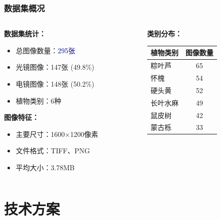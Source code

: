 \documentclass[12pt]{beamer}
\begin{document}
\begin{frame}
\frametitle{数据集概况}
\begin{columns}
\begin{column}{0.5\textwidth}
\textbf{数据集统计：}
\begin{itemize}
    \item 总图像数量：\textcolor{darkblue}{295张}
    \item 光镜图像：147张 (49.8\%)
    \item 电镜图像：148张 (50.2\%)
    \item 植物类别：6种
\end{itemize}

\vspace{0.3cm}
\textbf{图像特征：}
\begin{itemize}
    \item 主要尺寸：1600×1200像素
    \item 文件格式：TIFF、PNG
    \item 平均大小：3.78MB
\end{itemize}
\end{column}

\begin{column}{0.5\textwidth}
\textbf{类别分布：}
\begin{table}[h]
\centering
\small
\begin{tabular}{lc}
\toprule
\textbf{植物类别} & \textbf{图像数量} \\
\midrule
粽叶芦 & 65 \\
怀槐 & 54 \\
硬头黄 & 52 \\
长叶水麻 & 49 \\
鼠皮树 & 42 \\
蒙古栎 & 33 \\
\bottomrule
\end{tabular}
\end{table}
\end{column}
\end{columns}
\end{frame}

\section{技术方案}
\end{document}
